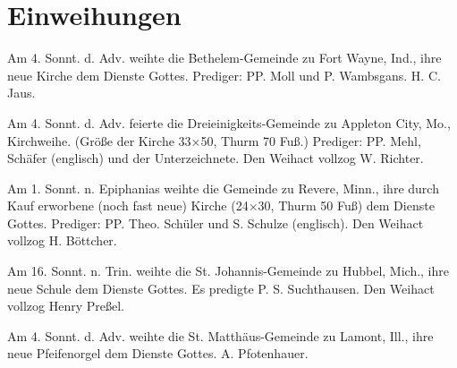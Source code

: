 \chapter{Einweihungen}

Am 4. Sonnt. d. Adv. weihte die Bethelem-Gemeinde zu Fort Wayne, Ind., ihre neue Kirche dem Dienste Gottes. Prediger: PP. Moll und P. Wambsgans. H. C. Jaus.

Am 4. Sonnt. d. Adv. feierte die Dreieinigkeits-Gemeinde zu Appleton City, Mo., Kirchweihe. (Größe der Kirche 33×50, Thurm 70 Fuß.) Prediger: PP. Mehl, Schäfer (englisch) und der Unterzeichnete. Den Weihact vollzog W. Richter.

Am 1. Sonnt. n. Epiphanias weihte die Gemeinde zu Revere, Minn., ihre durch Kauf erworbene (noch fast neue) Kirche (24×30, Thurm 50 Fuß) dem Dienste Gottes. Prediger: PP. Theo. Schüler und S. Schulze (englisch). Den Weihact vollzog H. Böttcher.

Am 16. Sonnt. n. Trin. weihte die St. Johannis-Gemeinde zu Hubbel, Mich., ihre neue Schule dem Dienste Gottes. Es predigte P. S. Suchthausen. Den Weihact vollzog Henry Preßel.

Am 4. Sonnt. d. Adv. weihte die St. Matthäus-Gemeinde zu Lamont, Ill., ihre neue Pfeifenorgel dem Dienste Gottes. A. Pfotenhauer.
